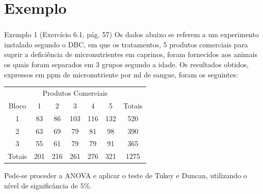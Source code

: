 \documentclass[14pt,aspectratio=1610]{beamer}
\begin{document}
\section{Exemplo}
\begin{frame}{}
\frametitle{}
\begin{block}{Exemplo 1 (Exercício 6.1, pág. 57)}
\justifying
Os dados abaixo se referem a um experimento instalado segundo o DBC, em que os tratamentos, 5 produtos comerciais para 
suprir a deficiência de micronutrientes em caprinos, foram fornecidos aos animais os quais foram separados em 3 grupos segundo a idade. Os resultados obtidos, 
expressos em ppm de micronutriente por ml de sangue, foram os seguintes:
\vspace{-0.5cm}
\begin{table}[!h]
\begin{tabular}{ccccccc}
\hline
\multicolumn{7}{c}{Produtos Comerciais}\\
\cline{2-6}
Bloco&1&2&3&4&5&Totais\\
\hline
1&83&86&103&116&132&520\\
2&63&69&79&81&98&390\\
3&55&61&79&79&91&365\\
\hline
Totais&201&216&261&276&321&1275\\
\hline
\end{tabular}
\end{table}
\vspace{-0.5cm}
Pede-se proceder a ANOVA e aplicar o teste de Tukey e Duncan, utilizando o nível de significância de $5\%$.
\end{block}
\end{frame}
\end{document}
